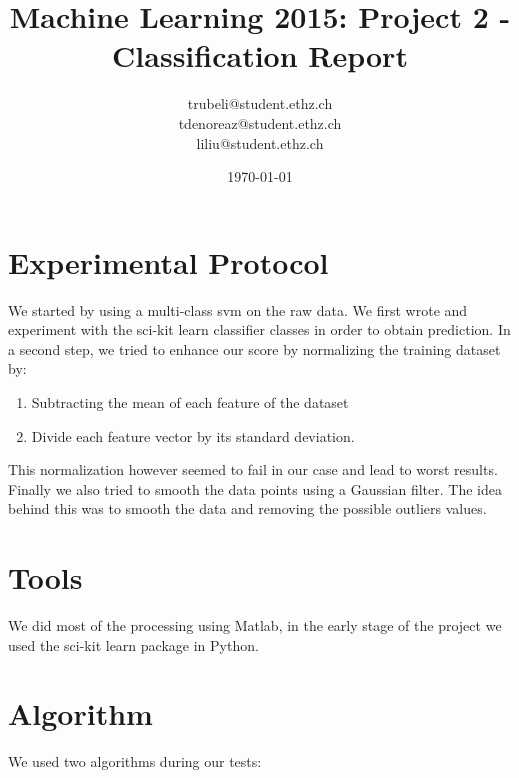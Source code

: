 \documentclass[a4paper, 11pt]{article}
\title{Machine Learning 2015: Project 2 - Classification Report}
\author{trubeli@student.ethz.ch\\ tdenoreaz@student.ethz.ch\\ liliu@student.ethz.ch\\}
\date{\today}
\begin{document}
\maketitle

\section*{Experimental Protocol}

We started by using a multi-class svm on the raw data. We first wrote and experiment with the sci-kit learn classifier classes in order to obtain prediction. In a second step, we tried to enhance our score by normalizing the training dataset by:

\begin{enumerate}
	\item Subtracting the mean of each feature of the dataset
	\item Divide each feature vector by its standard deviation.  
\end{enumerate}

This normalization however seemed to fail in our case and lead to worst results. Finally we also tried to smooth the data points using a Gaussian filter. The idea behind this was to smooth the data and removing the possible outliers values.

\section{Tools}

We did most of the processing using Matlab, in the early stage of the project we used the sci-kit learn package in Python. 

\section{Algorithm}
We used two algorithms during our tests:
\end{document}
